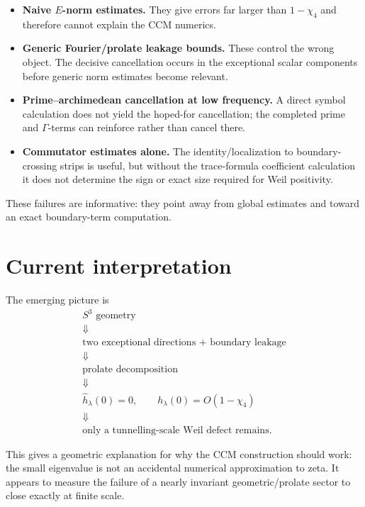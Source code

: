 \documentclass[11pt]{article}
\begin{document}
\begin{itemize}[leftmargin=2em]
\item \textbf{Naive \(E\)-norm estimates.}
They give errors far larger than \(1-\chi_4\) and therefore cannot
explain the CCM numerics.

\item \textbf{Generic Fourier/prolate leakage bounds.}
These control the wrong object.  The decisive cancellation occurs in
the exceptional scalar components before generic norm estimates become
relevant.

\item \textbf{Prime--archimedean cancellation at low frequency.}
A direct symbol calculation does not yield the hoped-for cancellation;
the completed prime and \(\Gamma\)-terms can reinforce rather than
cancel there.

\item \textbf{Commutator estimates alone.}
The identity/localization to boundary-crossing strips is useful, but
without the trace-formula coefficient calculation it does not determine
the sign or exact size required for Weil positivity.
\end{itemize}

These failures are informative: they point away from global estimates
and toward an exact boundary-term computation.

\section{Current interpretation}

The emerging picture is
\[
\boxed{
\begin{gathered}
S^3\text{ geometry}
\\
\Downarrow
\\
\text{two exceptional directions + boundary leakage}
\\
\Downarrow
\\
\text{prolate decomposition}
\\
\Downarrow
\\
\widehat h_\lambda(0)=0,\qquad
h_\lambda(0)=O(1-\chi_4)
\\
\Downarrow
\\
\text{only a tunnelling-scale Weil defect remains.}
\end{gathered}}
\]

This gives a geometric explanation for why the CCM construction should
work: the small eigenvalue is not an accidental numerical approximation
to zeta.  It appears to measure the failure of a nearly invariant
geometric/prolate sector to close exactly at finite scale.
\end{document}
